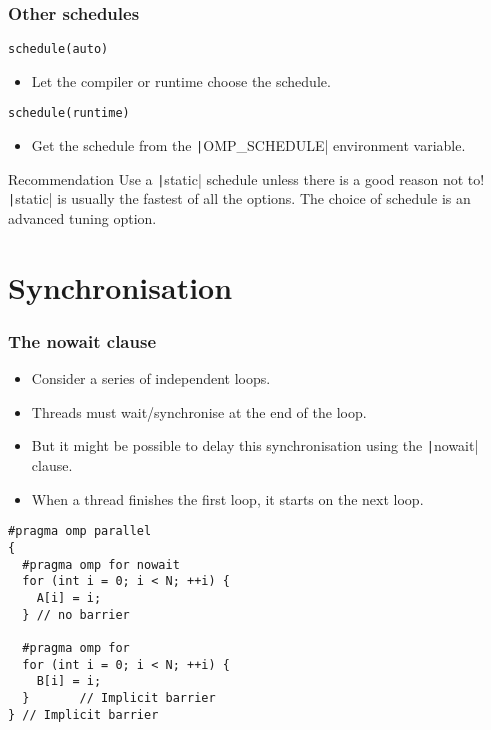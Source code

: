 \documentclass{beamer}
\begin{document}
\begin{frame}[fragile]
\frametitle{Other schedules}
\begin{verbatim}
schedule(auto)
\end{verbatim}
\begin{itemize}
  \item Let the compiler or runtime choose the schedule.
\end{itemize}

\vfill

\begin{verbatim}
schedule(runtime)
\end{verbatim}
\begin{itemize}
  \item Get the schedule from the \texttt|OMP_SCHEDULE| environment variable.
\end{itemize}

\begin{block}{Recommendation}
Use a \texttt|static| schedule unless there is a good reason not to!
\texttt|static| is usually the fastest of all the options.
The choice of schedule is an advanced tuning option.
\end{block}

\end{frame}

\section{Synchronisation}
\begin{frame}[fragile]
\frametitle{The nowait clause}
\begin{itemize}
  \item Consider a series of independent loops.
  \item Threads must wait/synchronise at the end of the loop.
  \item But it might be possible to delay this synchronisation using the \texttt|nowait| clause.
  \item When a thread finishes the first loop, it starts on the next loop.
\end{itemize}

\begin{verbatim}
#pragma omp parallel
{
  #pragma omp for nowait
  for (int i = 0; i < N; ++i) {
    A[i] = i;
  } // no barrier

  #pragma omp for
  for (int i = 0; i < N; ++i) {
    B[i] = i;
  }       // Implicit barrier
} // Implicit barrier
\end{verbatim}
\end{frame}
\end{document}
